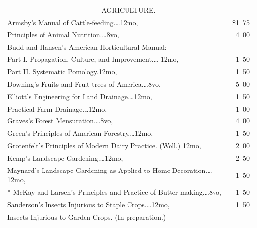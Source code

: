 \documentclass[a4paper,12pt]{book}[2004/02/16]
\theoremstyle{ilemma}
\theoremstyle{itheorem}
\theoremstyle{iother}
\theoremstyle{icorollary}
\theoremstyle{numcorollary}
\theoremstyle{idefinition}
\begin{document}
\footnotesize
\begin{longtable}{@{}l@{ }r@{}}

\multicolumn{2}{c}{\large AGRICULTURE.}\\[1em]
\nopagebreak
Armsby's Manual of Cattle-feeding.\dotfill\ldots 12mo, &\$1\ 75\\

\indent Principles of Animal Nutrition.\dotfill\ldots 8vo, &4\ 00\\

Budd and Hansen's American Horticultural Manual:\\

\indent Part I\@. Propagation, Culture, and Improvement.\dotfill\ldots
12mo, &1\ 50\\

\indent Part II\@. Systematic Pomology.\dotfill 12mo, &1\ 50\\

Downing's Fruits and Fruit-trees of America.\dotfill\ldots 8vo, &5\ 00\\

Elliott's Engineering for Land Drainage.\dotfill\ldots 12mo, &1\ 50\\

\indent Practical Farm Drainage.\dotfill\ldots 12mo, &1\ 00\\

Graves's Forest Mensuration.\dotfill\ldots 8vo, &4\ 00\\

Green's Principles of American Forestry.\dotfill\ldots 12mo, &1\ 50\\

Grotenfelt's Principles of Modern Dairy Practice. (Woll.)\dotfill
12mo, &2\ 00\\

Kemp's Landscape Gardening.\dotfill\ldots 12mo, &2\ 50\\

Maynard's Landscape Gardening as Applied to Home
Decoration.\dotfill\ldots 12mo, &1\ 50\\

* McKay and Larsen's Principles and Practice of
  Butter-making.\dotfill\ldots 8vo, &1\ 50\\

Sanderson's Insects Injurious to Staple Crops.\dotfill\ldots 12mo, &1\ 50\\

\indent Insects Injurious to Garden Crops. (In preparation.)\\


\end{longtable}
\end{document}
